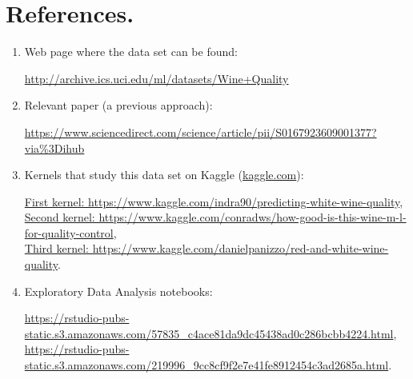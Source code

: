 \documentclass[10pt]{article}
\begin{document}
\section{References.}
\begin{enumerate}
  \item Web page where the data set can be found:

  \href{http://archive.ics.uci.edu/ml/datasets/Wine+Quality}{ http://archive.ics.uci.edu/ml/datasets/Wine+Quality}

  \item Relevant paper (a previous approach):

  \href{https://www.sciencedirect.com/science/article/pii/S0167923609001377?via\%3Dihub}{ https://www.sciencedirect.com/science/article/pii/S0167923609001377?via\%3Dihub}

  \item Kernels that study this data set on Kaggle (\href{www.kaggle.com}{kaggle.com}):

  \href{https://www.kaggle.com/indra90/predicting-white-wine-quality}{First kernel: https://www.kaggle.com/indra90/predicting-white-wine-quality},\\
  \href{https://www.kaggle.com/conradws/how-good-is-this-wine-m-l-for-quality-control}{Second kernel: https://www.kaggle.com/conradws/how-good-is-this-wine-m-l-for-quality-control},\\
  \href{https://www.kaggle.com/danielpanizzo/red-and-white-wine-quality}{Third kernel: https://www.kaggle.com/danielpanizzo/red-and-white-wine-quality}.

  \item Exploratory Data Analysis notebooks:

  \href{https://rstudio-pubs-static.s3.amazonaws.com/57835\_c4ace81da9dc45438ad0c286bcbb4224.html}{ https://rstudio-pubs-static.s3.amazonaws.com/57835\_c4ace81da9dc45438ad0c286bcbb4224.html},\\
  \href{https://rstudio-pubs-static.s3.amazonaws.com/219996\_9cc8cf9f2e7e41fe8912454c3ad2685a.html}{ https://rstudio-pubs-static.s3.amazonaws.com/219996\_9cc8cf9f2e7e41fe8912454c3ad2685a.html}.



\end{enumerate}
\end{document}
